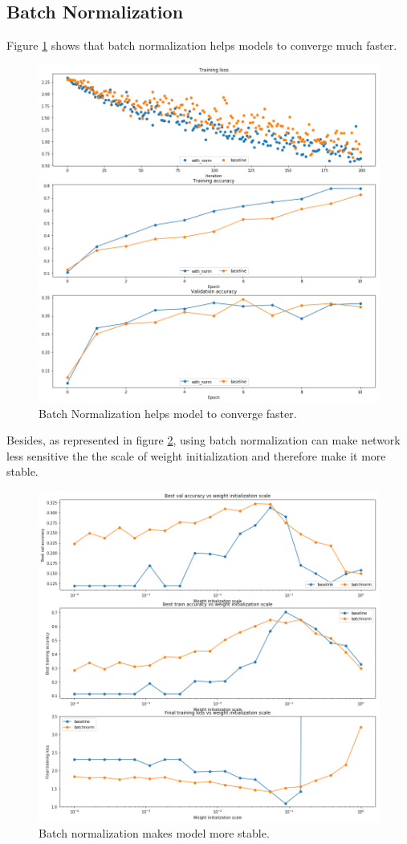 \documentclass{article} %
\begin{document}
\subsection{Batch Normalization}
Figure \ref{img:bn-convergence} shows that batch normalization helps models to converge much faster.
\begin{figure}[htbp]
	\centering
	\includegraphics[width=.7\textwidth]{bn-acc.png}
	\caption{Batch Normalization helps model to converge faster.}
	\label{img:bn-convergence}
\end{figure}

Besides, as represented in figure \ref{img:bn-init}, using batch normalization can make network less sensitive the the scale of weight initialization and therefore make it more stable.
\begin{figure}[htbp]
	\centering
	\includegraphics[width=.7\textwidth]{bn-init.png}
	\caption{Batch normalization makes model more stable.}
	\label{img:bn-init}
\end{figure}
\end{document}
